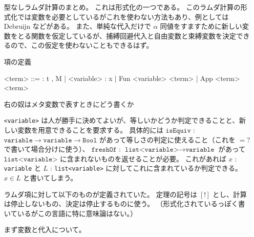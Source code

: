 \documentclass[dvipdfmx]{jsarticle}
\begin{document}
型なしラムダ計算のまとめ。
これは形式化の一つである。
このラムダ計算の形式化では変数を必要としているがこれを使わない方法もあり、例としては Debruijn などがある。
また、単純な代入だけで \(\alpha\) 同値をすますために新しい変数をとる関数を仮定しているが、捕縛回避代入と自由変数と束縛変数を決定できるので、この仮定を使わないこともできるはず。

\begin{itembox}[l]{項の定義}
  \begin{bnfgrammar}
    <term> ::= : t , M
    | <variable> : x
    | Fun <variable> <term>
    | App <term> <term>
  \end{bnfgrammar}
  右の奴はメタ変数で表すときにどう書くか
\end{itembox}

\texttt{<variable>} は人が勝手に決めてよいが、等しいかどうか判定できることと、新しい変数を用意できることを要求する。
具体的には \(\texttt{isEquiv}\) : \(\texttt{variable} \to \texttt{variable} \to \texttt{Bool}\) があって等しさの判定に使えること（これを \(=?\) で書いて場合分けに使う）、 \(\texttt{freshOf}\) : \(\texttt{list<variable>} \to \texttt{variable}\) があって \(\texttt{list<variable>}\) に含まれないものを返せることが必要。
これがあれば \(x\) : \texttt{variable} と \(L\) : \texttt{list<variable>} に対してこれに含まれているか判定できる。
\(x \in L\) と書いてしまう。

ラムダ項に対して以下のものが定義されていた。
定理の記号は \([!]\) とし、計算は停止しないもの、決定は停止するものに使う。
（形式化されているっぽく書いているがこの言語に特に意味論はない。）

まず変数と代入について。
\end{document}
